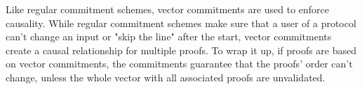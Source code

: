 Like regular commitment schemes, vector commitments are used to enforce causality. While regular commitment schemes make sure that a user of a protocol can't change an input or "skip the line" after the start, vector commitments create a causal relationship for multiple proofs. To wrap it up, if proofs are based on vector commitments, the commitments guarantee that the proofs' order can't change, unless the whole vector with all associated proofs are unvalidated.


